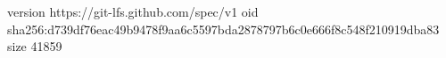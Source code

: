 version https://git-lfs.github.com/spec/v1
oid sha256:d739df76eac49b9478f9aa6c5597bda2878797b6c0e666f8c548f210919dba83
size 41859
